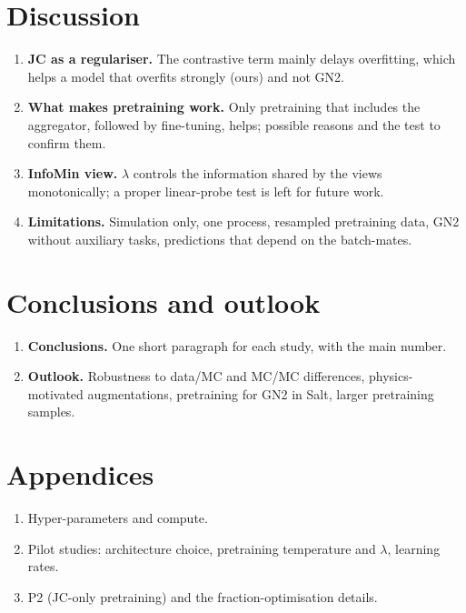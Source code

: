 \documentclass[11pt,a4paper]{article}
\begin{document}
\section{Discussion}
\begin{enumerate}
  \item \textbf{JC as a regulariser.} The contrastive term mainly delays overfitting, which helps
        a model that overfits strongly (ours) and not GN2.
  \item \textbf{What makes pretraining work.} Only pretraining that includes the aggregator,
        followed by fine-tuning, helps; possible reasons and the test to confirm them.
  \item \textbf{InfoMin view.} $\lambda$ controls the information shared by the views
        monotonically; a proper linear-probe test is left for future work.
  \item \textbf{Limitations.} Simulation only, one process, resampled pretraining data,
        GN2 without auxiliary tasks, predictions that depend on the batch-mates.
\end{enumerate}

\section{Conclusions and outlook}
\begin{enumerate}
  \item \textbf{Conclusions.} One short paragraph for each study, with the main number.
  \item \textbf{Outlook.} Robustness to data/MC and MC/MC differences, physics-motivated
        augmentations, pretraining for GN2 in Salt, larger pretraining samples.
\end{enumerate}

\section*{Appendices}
\begin{enumerate}
  \item Hyper-parameters and compute.
  \item Pilot studies: architecture choice, pretraining temperature and $\lambda$, learning rates.
  \item P2 (JC-only pretraining) and the fraction-optimisation details.
\end{enumerate}
\end{document}

